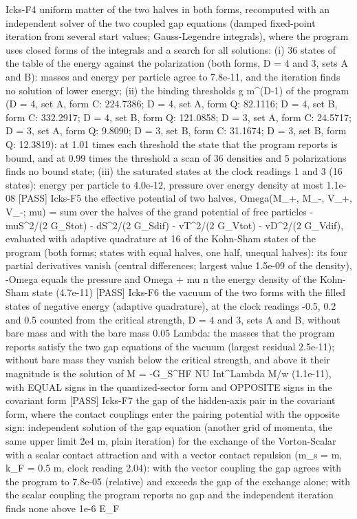 \documentclass[
  10pt,
]{article}
\newenvironment{Shaded}{}{}
\newcommand{\NormalTok}[1]{#1}
\begin{document}
\begin{Shaded}
\begin{Highlighting}[]
\NormalTok{[PASS] Icks{-}F4  uniform matter of the two halves in both forms, recomputed with an independent solver of the two coupled gap equations (damped fixed{-}point iteration from several start values; Gauss{-}Legendre integrals), where the program uses closed forms of the integrals and a search for all solutions: (i) 36 states of the table of the energy against the polarization (both forms, D = 4 and 3, sets A and B): masses and energy per particle agree to 7.8e{-}11, and the iteration finds no solution of lower energy; (ii) the binding thresholds g m\^{}(D{-}1) of the program (D = 4, set A, form C: 224.7386; D = 4, set A, form Q: 82.1116; D = 4, set B, form C: 332.2917; D = 4, set B, form Q: 121.0858; D = 3, set A, form C: 24.5717; D = 3, set A, form Q: 9.8090; D = 3, set B, form C: 31.1674; D = 3, set B, form Q: 12.3819): at 1.01 times each threshold the state that the program reports is bound, and at 0.99 times the threshold a scan of 36 densities and 5 polarizations finds no bound state; (iii) the saturated states at the clock readings 1 and 3 (16 states): energy per particle to 4.0e{-}12, pressure over energy density at most 1.1e{-}08}
\NormalTok{[PASS] Icks{-}F5  the effective potential of two halves, Omega(M\_+, M\_{-}, V\_+, V\_{-}; mu) = sum over the halves of the grand potential of free particles {-} muS\^{}2/(2 G\_Stot) {-} dS\^{}2/(2 G\_Sdif) {-} vT\^{}2/(2 G\_Vtot) {-} vD\^{}2/(2 G\_Vdif), evaluated with adaptive quadrature at 16 of the Kohn{-}Sham states of the program (both forms; states with equal halves, one half, unequal halves): its four partial derivatives vanish (central differences; largest value 1.5e{-}09 of the density), {-}Omega equals the pressure and Omega + mu n the energy density of the Kohn{-}Sham state (4.7e{-}11)}
\NormalTok{[PASS] Icks{-}F6  the vacuum of the two forms with the filled states of negative energy (adaptive quadrature), at the clock readings {-}0.5, 0.2 and 0.5 counted from the critical strength, D = 4 and 3, sets A and B, without bare mass and with the bare mass 0.05 Lambda: the masses that the program reports satisfy the two gap equations of the vacuum (largest residual 2.5e{-}11); without bare mass they vanish below the critical strength, and above it their magnitude is the solution of M = {-}G\_S\^{}HF NU Int\^{}Lambda M/w (1.1e{-}11), with EQUAL signs in the quantized{-}sector form and OPPOSITE signs in the covariant form}
\NormalTok{[PASS] Icks{-}F7  the gap of the hidden{-}axis pair in the covariant form, where the contact couplings enter the pairing potential with the opposite sign: independent solution of the gap equation (another grid of momenta, the same upper limit 2e4 m, plain iteration) for the exchange of the Vorton{-}Scalar with a scalar contact attraction and with a vector contact repulsion (m\_s = m, k\_F = 0.5 m, clock reading 2.04): with the vector coupling the gap agrees with the program to 7.8e{-}05 (relative) and exceeds the gap of the exchange alone; with the scalar coupling the program reports no gap and the independent iteration finds none above 1e{-}6 E\_F}

\end{Highlighting}
\end{Shaded}
\end{document}
